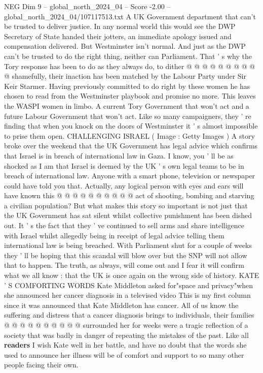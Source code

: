 \begin{textsample}{NEG Dim 9 – global\_north\_2024\_04 – Score -2.00 – global\_north\_2024\_04/107117513.txt}
A UK Government department that can't be trusted to deliver justice.
In any normal world this would see the DWP Secretary of State handed their jotters, an immediate apology issued and compensation delivered.
But Westminster isn't normal.
And just as the DWP can't be trusted to do the right thing, neither can Parliament.
That ' s why the Tory response has been to do as they always do, to dither @ @ @ @ @ @ @ @ @ @ shamefully, their inaction has been matched by the Labour Party under Sir Keir Starmer.
Having previously committed to do right by these women he has chosen to read from the Westminster playbook and promise no more.
This leaves the WASPI women in limbo.
A current Tory Government that won't act and a future Labour Government that won't act.
Like so many campaigners, they ' re finding that when you knock on the doors of Westminster it ' s almost impossible to prise them open.
CHALLENGING ISRAEL ( Image : Getty Images ) A story broke over the weekend that the UK Government has legal advice which confirms that Israel is in breach of international law in Gaza.
I know, you ' ll be as shocked as I am that Israel is deemed by the UK ' s own legal teams to be in breach of international law.
Anyone with a smart phone, television or newspaper could have told you that.
Actually, any logical person with eyes and ears will have known this @ @ @ @ @ @ @ @ @ @ act of shooting, bombing and starving a civilian population?
But what makes this story so important is not just that the UK Government has sat silent whilst collective punishment has been dished out.
It ' s the fact that they ' ve continued to sell arms and share intelligence with Israel whilst allegedly being in receipt of legal advice telling them international law is being breached.
With Parliament shut for a couple of weeks they ' ll be hoping that this scandal will blow over but the SNP will not allow that to happen.
The truth, as always, will come out and I fear it will confirm what we all know : that the UK is once again on the wrong side of history.
KATE ' S COMFORTING WORDS Kate Middleton asked for"space and privacy"when she announced her cancer diagnosis in a televised video This is my first column since it was announced that Kate Middleton has cancer.
All of us know the suffering and distress that a cancer diagnosis brings to individuals, their families @ @ @ @ @ @ @ @ @ @ surrounded her for weeks were a tragic reflection of a society that was badly in danger of repeating the mistakes of the past.
Like all \textbf{readers} I wish Kate well in her battle, and have no doubt that the words she used to announce her illness will be of comfort and support to so many other people facing their own.

\end{textsample}
